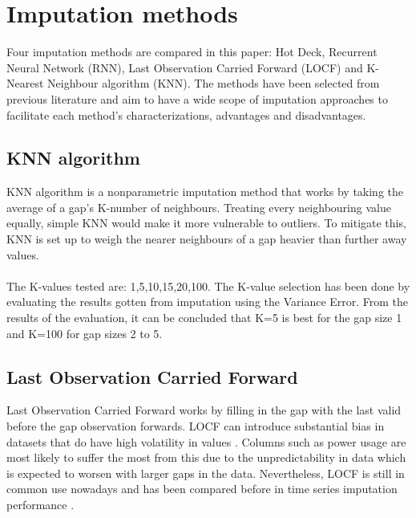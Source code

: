 \documentclass[9.5pt,article,twocolumn]{article}
\begin{document}
\section{Imputation methods}

Four imputation methods are compared in this paper: Hot Deck, Recurrent Neural Network (RNN), Last Observation Carried Forward (LOCF) and K-Nearest Neighbour algorithm (KNN). The methods have been selected from previous literature and aim to have a wide scope of imputation approaches to facilitate each method's characterizations, advantages and disadvantages. 

\subsection{KNN algorithm}
KNN algorithm is a nonparametric imputation method that works by taking the average of a gap’s K-number of neighbours. Treating every neighbouring value equally, simple KNN would make it more vulnerable to outliers. To mitigate this, KNN is set up to weigh the nearer neighbours of a gap heavier than further away values.
\\
\\
The K-values tested are: 1,5,10,15,20,100. The K-value selection has been done by evaluating the results gotten from imputation using the Variance Error. From the results of the evaluation, it can be concluded that K=5 is best for the gap size 1 and K=100 for gap sizes 2 to 5. 

\subsection{Last Observation Carried Forward}
Last Observation Carried Forward works by filling in the gap with the last valid before the gap observation forwards. LOCF can introduce substantial bias in datasets that do have high volatility in values  \cite{Little}. Columns such as power usage are most likely to suffer the most from this due to the unpredictability in data which is expected to worsen with larger gaps in the data. Nevertheless, LOCF is still in common use nowadays and has been compared before in time series imputation performance \cite{Pazhoohesh,Zhang}.
\end{document}
